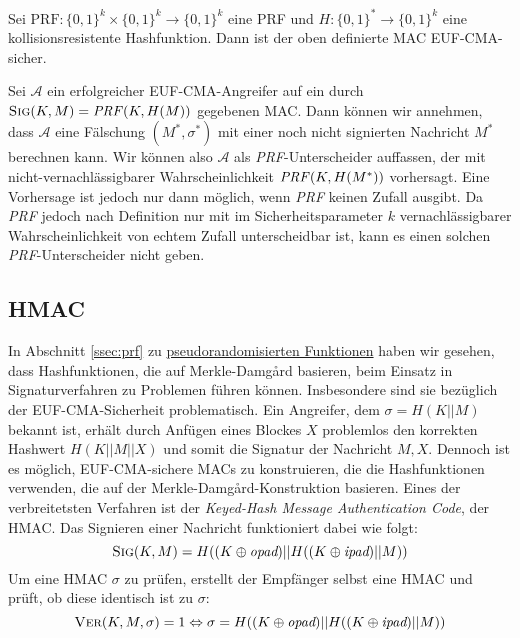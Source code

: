 \begin{theorem} Sei $\text{PRF}\colon\{0,1\}^k \times \{0,1\}^k
  \rightarrow \{0,1\}^k$ eine PRF und $H \colon \{0,1\}^* \rightarrow
  \{0,1\}^k$ eine kollisionsresistente Hashfunktion.  Dann ist der oben
  definierte MAC EUF-CMA-sicher.
\end{theorem} \vspace{10pt}

\begin{beweis}[Entwurf] Sei $\mathcal{A}$ ein erfolgreicher
  EUF-CMA-Angreifer auf ein durch $\textsc{Sig}(K,M) =
  \text{\textit{PRF}}(K,H(M))$ gegebenen MAC. Dann können wir annehmen,
  dass $\mathcal{A}$ eine Fälschung $(M^*,\sigma^*)$ mit einer noch nicht
  signierten Nachricht $M^*$ berechnen kann. Wir können also $\mathcal{A}$
  als \textit{PRF}-Unterscheider auffassen, der mit
  nicht-vernachlässigbarer Wahrscheinlichkeit
  $\text{\textit{PRF}}(K,H(M^*))$ vorhersagt. Eine Vorhersage ist jedoch
  nur dann möglich, wenn \textit{PRF} keinen Zufall ausgibt. Da
  \textit{PRF} jedoch nach Definition nur mit im Sicherheitsparameter $k$ vernachlässigbarer
  Wahrscheinlichkeit von echtem Zufall unterscheidbar ist, kann es einen
  solchen \textit{PRF}-Unterscheider nicht geben.
\end{beweis}

\subsection{HMAC} In Abschnitt \ref{ssec:prf} zu
\hyperref[ssec:prf]{pseudorandomisierten Funktionen}
haben wir gesehen, dass Hashfunktionen, die auf
Merkle-Damgård basieren, beim Einsatz in Signaturverfahren zu Problemen
führen können. Insbesondere sind sie bezüglich der EUF-CMA-Sicherheit
problematisch.  Ein Angreifer, dem $\sigma = H(K||M)$ bekannt ist, erhält
durch Anfügen eines Blockes $X$ problemlos den korrekten Hashwert
$H(K||M||X)$ und somit die Signatur der Nachricht $M,X$.  Dennoch ist es
möglich, EUF-CMA-sichere MACs zu konstruieren, die die Hashfunktionen
verwenden, die auf der Merkle-Damgård-Konstruktion basieren. Eines der verbreitetsten
Verfahren ist der \textit{Keyed-Hash Message Authentication Code}, der
HMAC. Das Signieren einer Nachricht funktioniert dabei wie folgt:
\begin{equation*}
  \textsc{Sig}(K,M) = H((K \oplus \textit{opad})||H((K \oplus\textit{ipad})|| M))
\end{equation*}
Um eine HMAC $\sigma$ zu prüfen, erstellt der Empfänger selbst eine HMAC
und prüft, ob diese identisch ist zu $\sigma$:
\[\textsc{Ver} (K, M, \sigma) =1 \Leftrightarrow \sigma = H((K \oplus \textit{opad})|| H((K \oplus \textit{ipad})|| M))\]

